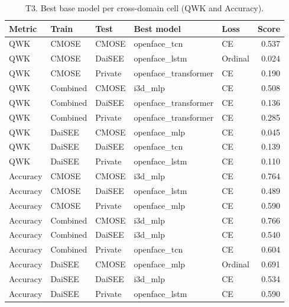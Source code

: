 \begin{table}
\caption{T3. Best base model per cross-domain cell (QWK and Accuracy).}
\label{tab:T3_crossdomain}
\begin{tabular}{lllllr}
\toprule
Metric & Train & Test & Best model & Loss & Score \\
\midrule
QWK & CMOSE & CMOSE & openface_tcn & CE & 0.537 \\
QWK & CMOSE & DaiSEE & openface_lstm & Ordinal & 0.024 \\
QWK & CMOSE & Private & openface_transformer & CE & 0.190 \\
QWK & Combined & CMOSE & i3d_mlp & CE & 0.508 \\
QWK & Combined & DaiSEE & openface_transformer & CE & 0.136 \\
QWK & Combined & Private & openface_transformer & CE & 0.285 \\
QWK & DaiSEE & CMOSE & openface_mlp & CE & 0.045 \\
QWK & DaiSEE & DaiSEE & openface_tcn & CE & 0.139 \\
QWK & DaiSEE & Private & openface_lstm & CE & 0.110 \\
Accuracy & CMOSE & CMOSE & i3d_mlp & CE & 0.764 \\
Accuracy & CMOSE & DaiSEE & openface_lstm & CE & 0.489 \\
Accuracy & CMOSE & Private & openface_mlp & CE & 0.590 \\
Accuracy & Combined & CMOSE & i3d_mlp & CE & 0.766 \\
Accuracy & Combined & DaiSEE & i3d_mlp & CE & 0.540 \\
Accuracy & Combined & Private & openface_tcn & CE & 0.604 \\
Accuracy & DaiSEE & CMOSE & openface_mlp & Ordinal & 0.691 \\
Accuracy & DaiSEE & DaiSEE & i3d_mlp & CE & 0.534 \\
Accuracy & DaiSEE & Private & openface_lstm & CE & 0.590 \\
\bottomrule
\end{tabular}
\end{table}
